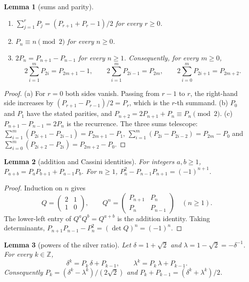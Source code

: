 \documentclass[11pt]{amsart}
\newtheorem{lemma}{Lemma}[section]
\theoremstyle{definition}
\theoremstyle{remark}
\theoremstyle{plain}
\numberwithin{equation}{section}
\newcommand{\Z}{\mathbb{Z}}
\begin{document}
\begin{lemma}[sums and parity]\label{lem:sums}
\begin{enumerate}[label=\textup{(\alph*)}]
\item $\sum_{j=1}^{r}P_j=(P_{r+1}+P_r-1)/2$ for every $r\ge0$.
\item $P_n\equiv n\pmod 2$ for every $n\ge0$.
\item $2P_n=P_{n+1}-P_{n-1}$ for every $n\ge1$. Consequently, for every $m\ge0$,
\[
2\sum_{i=1}^{m}P_{2i}=P_{2m+1}-1,\qquad 2\sum_{i=1}^{m}P_{2i-1}=P_{2m},\qquad
2\sum_{i=0}^{m}P_{2i+1}=P_{2m+2}.
\]
\end{enumerate}
\end{lemma}

\begin{proof}
(a) For $r=0$ both sides vanish. Passing from $r-1$ to $r$, the right-hand side increases by
$(P_{r+1}-P_{r-1})/2=P_r$, which is the $r$-th summand.
(b) $P_0$ and $P_1$ have the stated parities, and $P_{n+2}=2P_{n+1}+P_n\equiv P_n\pmod2$.
(c) $P_{n+1}-P_{n-1}=2P_n$ is the recurrence. The three sums telescope:
$\sum_{i=1}^m(P_{2i+1}-P_{2i-1})=P_{2m+1}-P_1$, $\sum_{i=1}^m(P_{2i}-P_{2i-2})=P_{2m}-P_0$ and
$\sum_{i=0}^m(P_{2i+2}-P_{2i})=P_{2m+2}-P_0$.
\end{proof}

\begin{lemma}[addition and Cassini identities]\label{lem:cassini}
For integers $a,b\ge1$, $P_{a+b}=P_aP_{b+1}+P_{a-1}P_b$. For $n\ge1$,
$P_n^2-P_{n-1}P_{n+1}=(-1)^{n+1}$.
\end{lemma}

\begin{proof}
Induction on $n$ gives
\[
Q=\begin{pmatrix}2&1\\1&0\end{pmatrix},\qquad
Q^n=\begin{pmatrix}P_{n+1}&P_n\\P_n&P_{n-1}\end{pmatrix}\quad(n\ge1).
\]
The lower-left entry of $Q^aQ^b=Q^{a+b}$ is the addition identity. Taking determinants,
$P_{n+1}P_{n-1}-P_n^2=(\det Q)^n=(-1)^n$.
\end{proof}

\begin{lemma}[powers of the silver ratio]\label{lem:powers}
Let $\delta=1+\sqrt2$ and $\lambda=1-\sqrt2=-\delta^{-1}$. For every $k\in\Z$,
\[
\delta^k=P_k\,\delta+P_{k-1},\qquad \lambda^k=P_k\,\lambda+P_{k-1}.
\]
Consequently $P_k=(\delta^k-\lambda^k)/(2\sqrt2)$ and $P_k+P_{k-1}=(\delta^k+\lambda^k)/2$.
\end{lemma}
\end{document}
